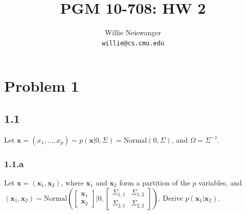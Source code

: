 \documentclass[12pt]{article}
\title{PGM 10-708: HW 2}
\author{Willie Neiswanger\\
\texttt{willie@cs.cmu.edu}}
\date{}
\begin{document}
\maketitle


\section*{Problem 1}
\label{sec:prob1}

\subsection*{1.1}
Let $\textbf{x} = (x_1,\ldots,x_p) \sim p(\textbf{x} | 0, \Sigma) = \text{Normal}(0,\Sigma)$, and $\Omega = \Sigma^{-1}$.

\subsubsection*{1.1.a}
Let $\textbf{x} = (\textbf{x}_1,\textbf{x}_2)$, where $\textbf{x}_1$ and $\textbf{x}_2$ form a partition of the $p$ variables, and 
$(\textbf{x}_1,\textbf{x}_2) \sim 
\text{Normal} \left( \left[ \begin{smallmatrix} \textbf{x}_1 \\ \textbf{x}_2 \end{smallmatrix} \right] | 0, \left[ \begin{smallmatrix} \Sigma_{1,1}& \Sigma_{1,2} \\ \Sigma_{2,1} & \Sigma_{2,2} \end{smallmatrix} \right] \right)$.
Derive $p(\textbf{x}_1 | \textbf{x}_2)$.\\
\end{document}
